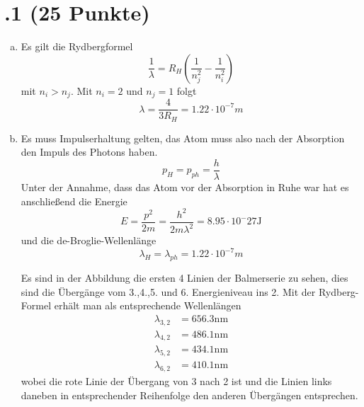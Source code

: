 \section*{\nr.1 \titone (25 Punkte)}
\begin{enumerate}[(a)]
\item Es gilt die Rydbergformel
\begin{equation}
  \frac{1}{\lambda}=R_H\left(\frac{1}{n_j^2}-\frac{1}{n_i^2}\right)
\end{equation}
mit $n_i>n_j$. Mit $n_i=2$ und $n_j=1$ folgt
\begin{equation}
  \lambda = \frac{4}{3R_H}=1.22\cdot10^{-7}m
\end{equation}
\item Es muss Impulserhaltung gelten, das Atom muss also nach der Absorption den Impuls des Photons haben.
\begin{equation}
  p_H = p_{ph}=\frac{h}{\lambda}
\end{equation}
Unter der Annahme, dass das Atom vor der Absorption in Ruhe war hat es anschließend die Energie
\begin{equation}
  E=\frac{p^2}{2m}=\frac{h^2}{2m\lambda^2}=8.95\cdot 10^-27\mathrm{J}
\end{equation}
und die de-Broglie-Wellenlänge
\begin{equation}
  \lambda_H=\lambda_{ph}=1.22\cdot 10^{-7}m
\end{equation}

Es sind in der Abbildung die ersten 4 Linien der Balmerserie zu sehen, dies sind die Übergänge vom 3.,4.,5. und 6. Energieniveau ins 2. Mit der Rydberg-Formel erhält man als entsprechende Wellenlängen
\begin{align}
  \lambda_{3,2}&=656.3\mathrm{nm}\\
  \lambda_{4,2}&=486.1\mathrm{nm}\\
  \lambda_{5,2}&=434.1\mathrm{nm}\\
  \lambda_{6,2}&=410.1\mathrm{nm}
\end{align}
wobei die rote Linie der Übergang von 3 nach 2 ist und die Linien links daneben in entsprechender Reihenfolge den anderen Übergängen entsprechen.  

\end{enumerate}